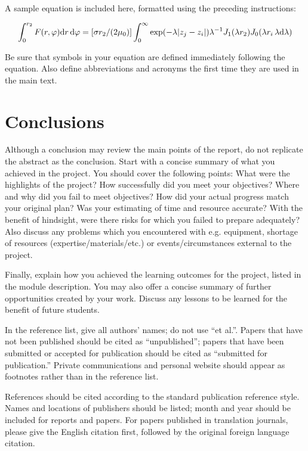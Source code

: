 \documentclass{engr1000j-s2}
\begin{document}
A sample equation is included here, formatted using the preceding instructions:

\begin{equation}
\label{sample:equation}
\int^{r_2}_0 F(r,\varphi){\rm d}r\,{\rm d}\varphi = [\sigma r_2/(2\mu_0)]\int^{\infty}_0\exp(-\lambda|z_j-z_i|)\lambda^{-1}J_1 (\lambda r_2)J_0 (\lambda r_i\,\lambda {\rm d}\lambda)
\end{equation}

Be sure that symbols in your equation are defined immediately following the equation. Also define abbreviations and acronyms the first time they are used in the main text.

  \section{Conclusions}
  Although a conclusion may review the main points of the report, do not
  replicate the abstract as the conclusion. Start with a concise summary of what
  you achieved in the project. You should cover the following points: What were the
  highlights of the project? How successfully did you meet your objectives? Where
  and why did you fail to meet objectives? How did your actual progress match
  your original plan? Was your estimating of time and resource accurate? With
  the benefit of hindsight, were there risks for which you failed to prepare adequately?
  Also discuss any problems which you encountered with e.g. equipment, shortage
  of resources (expertise/materials/etc.) or events/circumstances external to the
  project.

  Finally, explain how you achieved the learning outcomes for the project, listed
  in the module description. You may also offer a concise summary of further
  opportunities created by your work. Discuss any lessons to be learned for the benefit
  of future students.

  \hspace{1em}
  
  

  In the reference list, give all authors' names; do not use ``et al.''. Papers that have not been published should be cited as ``unpublished''; papers that have been submitted or accepted for publication should be cited as ``submitted for publication.'' Private communications and personal website should appear as footnotes rather than in the reference list.

  References should be cited according to the standard publication reference style. Names and locations of publishers should be listed; month and year should be included for reports and papers. For papers published in translation journals, please give the English citation first, followed by the original foreign language citation.
\end{document}

